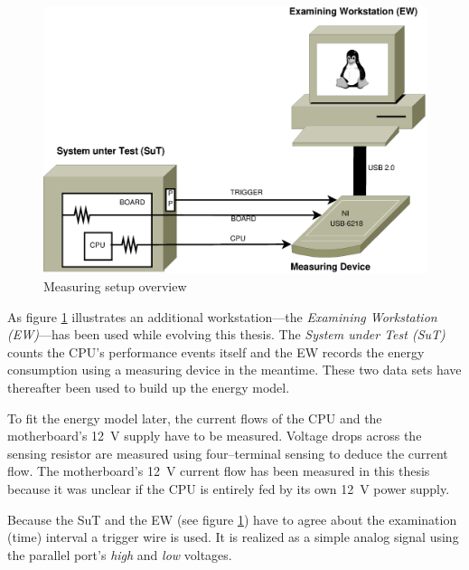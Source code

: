 \label{sec:design}


\label{sec:big-pic}

\begin{figure}
  \centering
    \includegraphics[width=\textwidth]{fig/measuring-overview.eps}
  \caption{Measuring setup overview}
  \label{fig:overview}
\end{figure}

As figure \ref{fig:overview} illustrates an additional workstation---the
\emph{Examining Workstation (EW)}---has been used while evolving this thesis.
The \emph{System under Test (SuT)} counts the CPU's performance events itself
and the EW records the energy consumption using a measuring device in the
meantime. These two data sets have thereafter been used to build up the energy
model.


\label{sec:measuring-setup}

To fit the energy model later, the current flows of the CPU and the
motherboard's \SI{12}{\volt} supply have to be measured. Voltage drops across
the sensing resistor are measured using four--terminal sensing \cite{wiki:FTS}
to deduce the current flow. The motherboard's \SI{12}{\volt} current flow has
been measured in this thesis because it was unclear if the CPU is entirely fed
by its own \SI{12}{\volt} power supply.

Because the SuT and the EW (see figure \ref{fig:overview}) have to agree about
the examination (time) interval a trigger wire is used. It is realized as a
simple analog signal using the parallel port's \emph{high} and \emph{low}
voltages.

